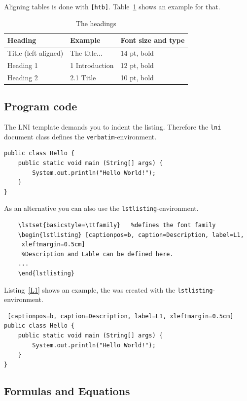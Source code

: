 \documentclass[english]{lni}
\begin{document}
Aligning tables is done with \verb|[htb]|. Table~\ref{tab1} shows an example for that.

\begin{table}[htb]
	\centering
	\begin{tabular}{l l l}
		\hline
		Heading              & Example        & Font size and type \\
		\hline
		Title (left aligned) & The title...   & 14 pt, bold        \\
		Heading 1            & 1 Introduction & 12 pt, bold        \\
		Heading 2            & 2.1 Title      & 10 pt, bold        \\
		\hline
	\end{tabular}
	\caption{\label{tab1}The headings}
\end{table}

\subsection{Program code}
The LNI template demands you to indent the listing. Therefore the \texttt{lni} document class defines the \texttt{verbatim}-environment.
\begin{verbatim}
public class Hello { 
    public static void main (String[] args) { 
        System.out.println("Hello World!"); 
    } 
} 
\end{verbatim}

As an alternative you can also use the \texttt{lstlisting}-environment.
\begin{verbatim}
	\lstset{basicstyle=\ttfamily}	%defines the font family
	\begin{lstlisting} [captionpos=b, caption=Description, label=L1,
	 xleftmargin=0.5cm]
	 %Description and Lable can be defined here.
	...
	\end{lstlisting}
\end{verbatim}

Listing~\ref{L1} shows an example, the was created with the \texttt{lstlisting}-environment.

\lstset{basicstyle=\ttfamily}
\begin{lstlisting} [captionpos=b, caption=Description, label=L1, xleftmargin=0.5cm]
public class Hello { 
    public static void main (String[] args) { 
        System.out.println("Hello World!"); 
    } 
}
\end{lstlisting}

\subsection{Formulas and Equations}
\end{document}
